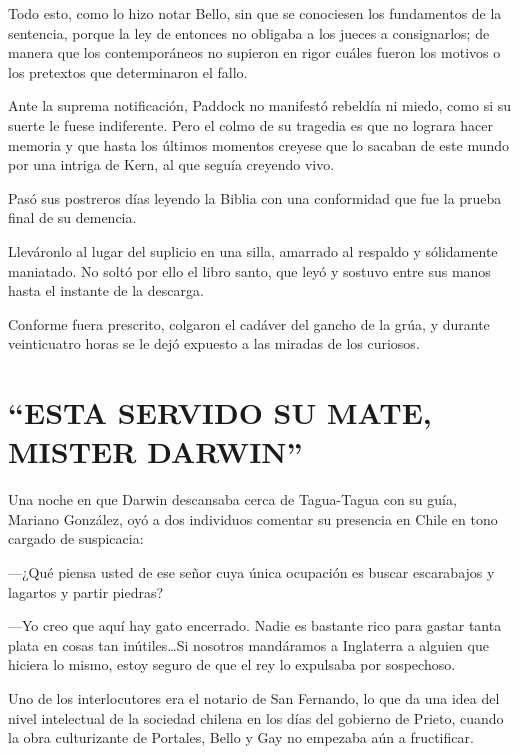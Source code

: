 \documentclass[10pt,twoside,openright]{memoir}
\begin{document}
Todo esto, como lo hizo notar Bello, sin que se conociesen los
fundamentos de la sentencia, porque la ley de entonces no obligaba a los
jueces a consignarlos; de manera que los contemporáneos no supieron en
rigor cuáles fueron los motivos o los pretextos que determinaron el
fallo.

Ante la suprema notificación, Paddock no manifestó rebeldía ni miedo,
como si su suerte le fuese indiferente. Pero el colmo de su tragedia es
que no lograra hacer memoria y que hasta los últimos momentos creyese
que lo sacaban de este mundo por una intriga de Kern, al que seguía
creyendo vivo.

Pasó sus postreros días leyendo la
Biblia con una conformidad que fue la prueba final de su demencia.

Lleváronlo al lugar del suplicio en una silla, amarrado al respaldo y
sólidamente maniatado. No soltó por ello el libro santo, que leyó y
sostuvo entre sus manos hasta el instante de la descarga.

Conforme fuera prescrito, colgaron el cadáver del gancho de la grúa, y
durante veinticuatro horas se le dejó expuesto a las miradas de los
curiosos.

\chapter{``ESTA SERVIDO SU MATE, MISTER DARWIN''}

Una noche en que Darwin descansaba cerca de Tagua-Tagua con su guía,
Mariano González, oyó a dos individuos comentar su presencia en Chile en
tono cargado de suspicacia:

---¿Qué piensa usted de ese señor cuya única ocupación es buscar
escarabajos y lagartos y partir piedras?

---Yo creo que aquí hay gato
encerrado. Nadie es bastante rico para gastar tanta plata en cosas tan
inútiles\ldots Si nosotros mandáramos a Inglaterra a alguien que hiciera lo
mismo, estoy seguro de que el rey lo expulsaba por sospechoso.

Uno de los interlocutores era el notario de San Fernando, lo que da una
idea del nivel intelectual de la sociedad chilena en los días del
gobierno de Prieto, cuando la obra culturizante de Portales, Bello y Gay
no empezaba aún a fructificar.
\end{document}
